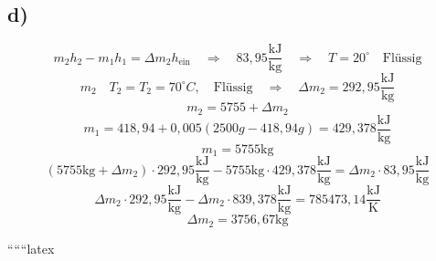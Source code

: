 

\subsection*{d)}
\[
m_2 h_2 - m_1 h_1 = \Delta m_2 h_{\text{ein}} \quad \Rightarrow \quad 83,95 \frac{\text{kJ}}{\text{kg}} \quad \Rightarrow \quad T = 20^\circ \quad \text{Flüssig}
\]
\[
m_2 \quad T_2 = T_2 = 70^\circ C, \quad \text{Flüssig} \quad \Rightarrow \quad \Delta m_2 = 292,95 \frac{\text{kJ}}{\text{kg}}
\]
\[
m_2 = 5755 + \Delta m_2
\]
\[
m_1 = 418,94 + 0,005 (2500 g - 418,94 g) = 429,378 \frac{\text{kJ}}{\text{kg}}
\]
\[
m_1 = 5755 \text{kg}
\]
\[
(5755 \text{kg} + \Delta m_2) \cdot 292,95 \frac{\text{kJ}}{\text{kg}} - 5755 \text{kg} \cdot 429,378 \frac{\text{kJ}}{\text{kg}} = \Delta m_2 \cdot 83,95 \frac{\text{kJ}}{\text{kg}}
\]
\[
\Delta m_2 \cdot 292,95 \frac{\text{kJ}}{\text{kg}} - \Delta m_2 \cdot 839,378 \frac{\text{kJ}}{\text{kg}} = 785473,14 \frac{\text{kJ}}{\text{K}}
\]
\[
\Delta m_2 = 3756,67 \text{kg}
\]

``````latex